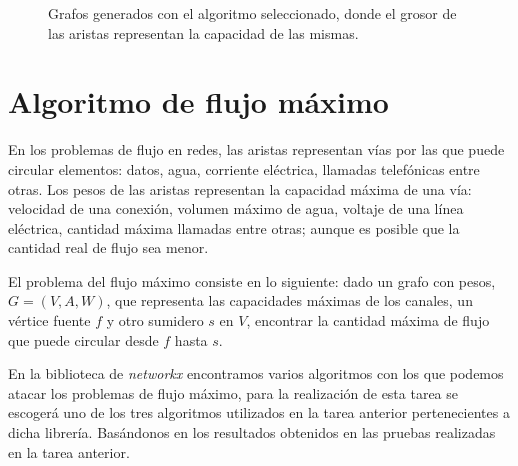 \documentclass{article}
\begin{document}
\begin{figure}[htbp]
\caption{Grafos generados con el algoritmo seleccionado, donde el grosor de las aristas representan la capacidad de las mismas.}
\label{fig1} 
\end{figure}


\newpage
\section{Algoritmo de flujo máximo}
En los problemas de flujo en redes, las aristas representan vías por las que puede circular elementos: datos, agua, corriente eléctrica, llamadas telefónicas entre otras. Los pesos de las aristas representan la capacidad máxima de una vía: velocidad de una conexión, volumen máximo de agua, voltaje de una línea eléctrica, cantidad máxima llamadas entre otras; aunque es posible que la cantidad real de flujo sea menor.

El problema del flujo máximo consiste en lo siguiente: dado un grafo con pesos, $G = (V, A, W)$, que representa las capacidades máximas de los canales, un vértice fuente $f$ y otro sumidero $s$ en $ V $, encontrar la cantidad máxima de flujo que puede circular desde $f$ hasta $s$.

En la biblioteca de \textit{networkx} encontramos varios algoritmos con los que podemos atacar los problemas de flujo máximo, para la realización de esta tarea se escogerá uno de los tres algoritmos utilizados en la tarea anterior pertenecientes a dicha librería. Basándonos en los resultados obtenidos en las pruebas realizadas en la tarea anterior.
\end{document}
